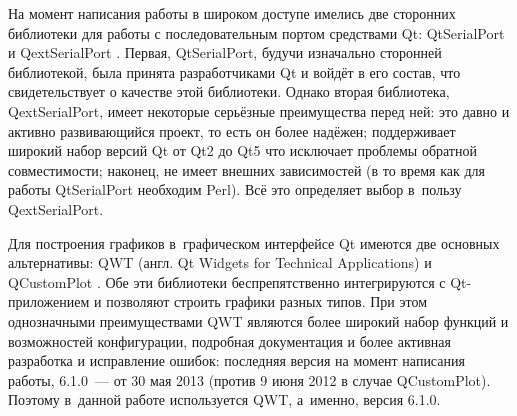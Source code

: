 \documentclass[a4paper, 14pt]{extarticle}
\newcommand{\eng}[1]{{\English #1}}
\newenvironment{myfigure}[2]%
    {\pushQED{\caption{#1} \label{#2}} %
     \begin{figure}[!htb]\centering } %
    {  \popQED %
     \end{figure}}
\newcommand{\includefigure}[3][]{
    \begin{myfigure}{#2}{fig:#3}
      \texttt{[image: \#3]}
    \end{myfigure}
  }
\begin{document}



  На момент написания работы в широком доступе имелись две сторонних библиотеки для работы с
  последовательным портом средствами Qt: QtSerialPort \cite{qtserialport} и QextSerialPort \cite{qextserialport}.
  Первая, QtSerialPort, будучи изначально сторонней библиотекой, была принята разработчиками Qt и
  войдёт в его состав, что свидетельствует о качестве этой библиотеки. Однако вторая
  библиотека, QextSerialPort, имеет некоторые серьёзные преимущества перед ней: это давно и активно
  развивающийся проект, то есть он более надёжен; поддерживает широкий набор версий Qt от Qt2 до Qt5
  что исключает проблемы обратной совместимости; наконец, не имеет внешних зависимостей (в то время
  как для работы QtSerialPort необходим Perl). Всё это определяет выбор в~пользу QextSerialPort.

  Для построения графиков в~графическом интерфейсе Qt имеются две основных альтернативы: QWT (англ.
  \eng{Qt Widgets for Technical Applications}) \cite{qwt} и QCustomPlot \cite{qcustomplot}.  Обе эти
  библиотеки беспрепятственно интегрируются с Qt-приложением и позволяют строить графики разных
  типов. При этом однозначными преимуществами QWT являются более широкий набор функций и
  возможностей конфигурации, подробная документация и более активная разработка и исправление
  ошибок: последняя версия на момент написания работы, 6.1.0~--- от 30 мая 2013 (против 9 июня 2012 в
  случае QCustomPlot). Поэтому в~данной работе используется QWT, а~именно, версия 6.1.0.
\end{document}

